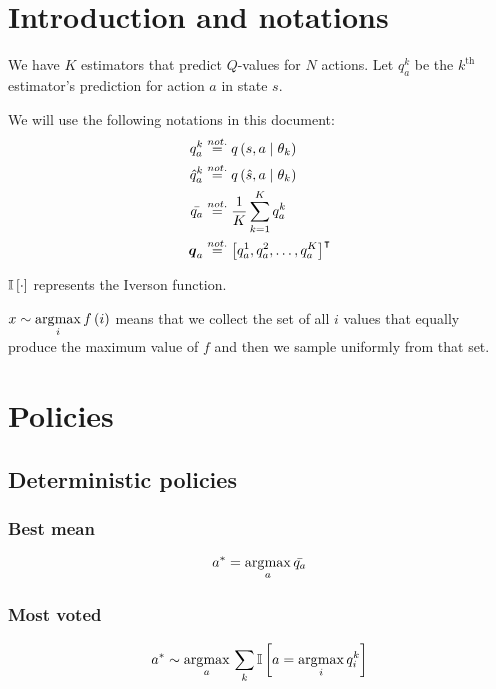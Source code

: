 \documentclass[10pt]{article}
\begin{document}
\section{Introduction and notations}
\label{sec:intro}

We have $K$ estimators that predict $Q$-values for $N$ actions. Let $q_a^k$ be
the $k^{\text{th}}$ estimator's prediction for action $a$ in state $s$.

We will use the following notations in this document:
\begin{align}
	q_a^k        & \overset{not.}{=} \func[q]{s, a \mid \theta_k}                       \\
	\hat{q}_a^k  & \overset{not.}{=} \func[q]{\hat{s}, a \mid \theta_k}                 \\
	\bar{q_a}    & \overset{not.}{=} \frac{1}{K}\sum_{k=1}^{K} q_a^k                    \\
	\tensor{q}_a & \overset{not.}{=} \trans{\left[ q_a^1, q_a^2, \ldots, q_a^K \right]}
\end{align}

$\iverson{\cdot}$ represents the Iverson function.

$x\sim \argmax{i}\func{i}$ means that we collect the set of all $i$ values that
equally produce the maximum value of $f$ and then we sample uniformly from that
set.

\section{Policies}
\label{sec:policies}

\subsection{Deterministic policies}

\subsubsection{Best mean}
\begin{equation}
	a^* = \argmax{a} \bar{q_a}
\end{equation}

\subsubsection{Most voted}
\begin{equation}
	a^* \sim \argmax{a} \sum_{k} \iverson{a = \argmax{i} q^k_i}
\end{equation}
\end{document}
